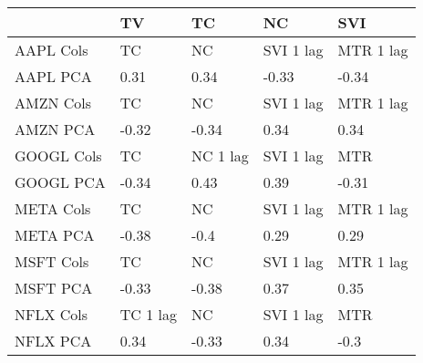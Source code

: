 \begin{tabular}{lllll}
\toprule
{} &        TV &        TC &         NC &        SVI \\
\midrule
AAPL Cols  &        TC &        NC &  SVI 1 lag &  MTR 1 lag \\
AAPL PCA   &      0.31 &      0.34 &      -0.33 &      -0.34 \\
AMZN Cols  &        TC &        NC &  SVI 1 lag &  MTR 1 lag \\
AMZN PCA   &     -0.32 &     -0.34 &       0.34 &       0.34 \\
GOOGL Cols &        TC &  NC 1 lag &  SVI 1 lag &        MTR \\
GOOGL PCA  &     -0.34 &      0.43 &       0.39 &      -0.31 \\
META Cols  &        TC &        NC &  SVI 1 lag &  MTR 1 lag \\
META PCA   &     -0.38 &      -0.4 &       0.29 &       0.29 \\
MSFT Cols  &        TC &        NC &  SVI 1 lag &  MTR 1 lag \\
MSFT PCA   &     -0.33 &     -0.38 &       0.37 &       0.35 \\
NFLX Cols  &  TC 1 lag &        NC &  SVI 1 lag &        MTR \\
NFLX PCA   &      0.34 &     -0.33 &       0.34 &       -0.3 \\
\bottomrule
\end{tabular}
